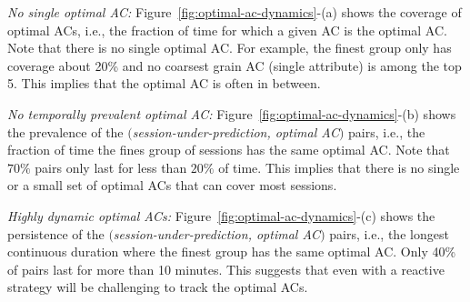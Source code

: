 \begin{packeditemize}
	\item {\it No single optimal AC:} Figure~\ref{fig:optimal-ac-dynamics}-(a) shows the coverage of optimal ACs, i.e., the fraction of time for which a given AC is the optimal AC. Note that there is no single optimal AC. For example, the finest group only has coverage about 20\% and no coarsest grain AC (single attribute) is among the top 5. This implies that the optimal AC is often in between.
	\item {\it No temporally prevalent optimal AC:} Figure~\ref{fig:optimal-ac-dynamics}-(b) shows the prevalence of the $($\emph{session-under-prediction, optimal AC}$)$ pairs, i.e., the fraction of time the fines group of sessions has the same optimal AC. Note that $70\%$ pairs only last for less than $20\%$ of time. This implies that there is no single or a small set of optimal ACs that can cover most sessions.
	\item {\it Highly dynamic optimal ACs:} Figure~\ref{fig:optimal-ac-dynamics}-(c) shows the persistence of the $($\emph{session-under-prediction, optimal AC}$)$ pairs, i.e., the longest continuous duration where the finest group has the same optimal AC. Only 40\% of pairs last for more than 10 minutes. This suggests that even with a reactive strategy will be challenging to track the optimal ACs.
\end{packeditemize}


